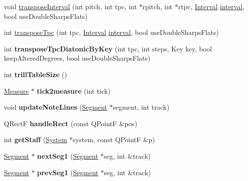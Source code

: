 \begin{DoxyCompactItemize}
\item 
void \hyperlink{namespace_ms_aab75a202cfc63fdfe7e31f65ce0f7f08}{transpose\+Interval} (int pitch, int tpc, int $\ast$rpitch, int $\ast$rtpc, \hyperlink{struct_ms_1_1_interval}{Interval} \hyperlink{class_interval}{interval}, bool use\+Double\+Sharps\+Flats)
\item 
int \hyperlink{namespace_ms_aadff93cbcbcdb58026a95a5f6e9e9573}{transpose\+Tpc} (int tpc, \hyperlink{struct_ms_1_1_interval}{Interval} \hyperlink{class_interval}{interval}, bool use\+Double\+Sharps\+Flats)
\item 
\mbox{\label{namespace_ms_a51c995cb41439293f2a821edcb2fc08f}} 
int {\bfseries transpose\+Tpc\+Diatonic\+By\+Key} (int tpc, int steps, Key key, bool keep\+Altered\+Degrees, bool use\+Double\+Sharps\+Flats)
\item 
\mbox{\label{namespace_ms_ab798cc32001a3ad943836c16185da3f9}} 
int {\bfseries trill\+Table\+Size} ()
\item 
\mbox{\label{namespace_ms_aee57ec45c319c2b3ca450db5b34ca01e}} 
\hyperlink{class_ms_1_1_measure}{Measure} $\ast$ {\bfseries tick2measure} (int tick)
\item 
\mbox{\label{namespace_ms_a7b927c615ab96a4b08fdb9f1cdceeea1}} 
void {\bfseries update\+Note\+Lines} (\hyperlink{class_ms_1_1_segment}{Segment} $\ast$segment, int track)
\item 
\mbox{\label{namespace_ms_a80082e2f7efcacf92e83a486274892b7}} 
Q\+RectF {\bfseries handle\+Rect} (const Q\+PointF \&pos)
\item 
\mbox{\label{namespace_ms_a28faf98545a7df38b8a34ca725a59d1c}} 
int {\bfseries get\+Staff} (\hyperlink{class_ms_1_1_system}{System} $\ast$system, const Q\+PointF \&p)
\item 
\mbox{\label{namespace_ms_a428a8fae24400194313a14c66ca60f80}} 
\hyperlink{class_ms_1_1_segment}{Segment} $\ast$ {\bfseries next\+Seg1} (\hyperlink{class_ms_1_1_segment}{Segment} $\ast$seg, int \&track)
\item 
\mbox{\label{namespace_ms_af3cac9595b430b4b4f40f7a8978a8b95}} 
\hyperlink{class_ms_1_1_segment}{Segment} $\ast$ {\bfseries prev\+Seg1} (\hyperlink{class_ms_1_1_segment}{Segment} $\ast$seg, int \&track)

\end{DoxyCompactItemize}
